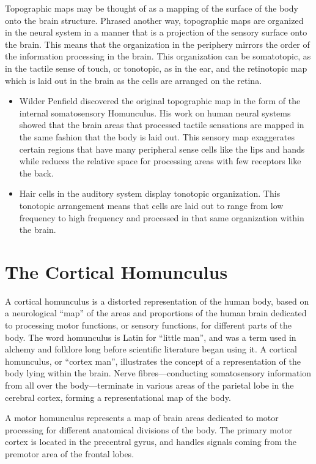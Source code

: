 Topographic maps may be thought of as a mapping of the surface of the body onto the brain structure. Phrased another way, topographic maps are organized in the neural system in a manner that is a projection of the sensory surface onto the brain. This means that the organization in the periphery mirrors the order of the information processing in the brain. This organization can be somatotopic, as in the tactile sense of touch, or tonotopic, as in the ear, and the retinotopic map which is laid out in the brain as the cells are arranged on the retina.

\begin{itemize}
\tightlist
\item
  Wilder Penfield discovered the original topographic map in the form of the internal somatosensory Homunculus. His work on human neural systems showed that the brain areas that processed tactile sensations are mapped in the same fashion that the body is laid out. This sensory map exaggerates certain regions that have many peripheral sense cells like the lips and hands while reduces the relative space for processing areas with few receptors like the back.
\item
  Hair cells in the auditory system display tonotopic organization. This tonotopic arrangement means that cells are laid out to range from low frequency to high frequency and processed in that same organization within the brain.
\end{itemize}

\hypertarget{the-cortical-homunculus}{%
\section{The Cortical Homunculus}\label{the-cortical-homunculus}}

A cortical homunculus is a distorted representation of the human body, based on a neurological ``map'' of the areas and proportions of the human brain dedicated to processing motor functions, or sensory functions, for different parts of the body. The word homunculus is Latin for ``little man'', and was a term used in alchemy and folklore long before scientific literature began using it. A cortical homunculus, or ``cortex man'', illustrates the concept of a representation of the body lying within the brain. Nerve fibres---conducting somatosensory information from all over the body---terminate in various areas of the parietal lobe in the cerebral cortex, forming a representational map of the body.

A motor homunculus represents a map of brain areas dedicated to motor processing for different anatomical divisions of the body. The primary motor cortex is located in the precentral gyrus, and handles signals coming from the premotor area of the frontal lobes.

